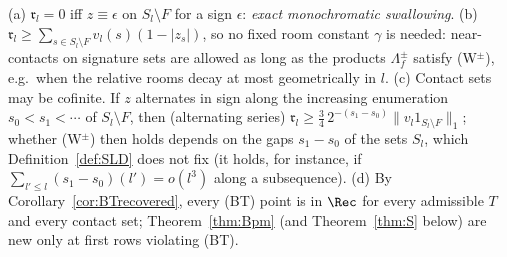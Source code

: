 \begin{remark}\label{rem:Bpm}
(a) $\mathfrak r_l=0$ iff $z\equiv\epsilon$ on $S_l\setminus F$ for a sign
$\epsilon$: \emph{exact monochromatic swallowing}.  (b) $\mathfrak r_l\ge
\sum_{s\in S_l\setminus F}v_l(s)(1-|z_s|)$, so no fixed room constant
$\gamma$ is needed: near-contacts on signature sets are allowed as long as
the products $\Lambda^\pm_f$ satisfy (W$^\pm$), e.g.\ when the relative
rooms decay at most geometrically in $l$.  (c) Contact sets may be
cofinite.  If $z$ alternates in sign along the increasing enumeration
$s_0<s_1<\cdots$ of $S_l\setminus F$, then (alternating series)
$\mathfrak r_l\ge\frac34\,2^{-(s_1-s_0)}\|v_l1_{S_l\setminus F}\|_1$; whether
(W$^\pm$) then holds depends on the gaps $s_1-s_0$ of the sets $S_l$, which
Definition~\ref{def:SLD} does not fix (it holds, for instance, if
$\sum_{l'\le l}(s_1-s_0)(l')=o(l^3)$ along a subsequence).  (d) By
Corollary~\ref{cor:BTrecovered}, every \textup{(BT)} point is in $\Rec$
for every admissible $T$ and every contact set; Theorem~\ref{thm:Bpm} (and
Theorem~\ref{thm:S} below) are new only at first rows violating
\textup{(BT)}.
\end{remark}
